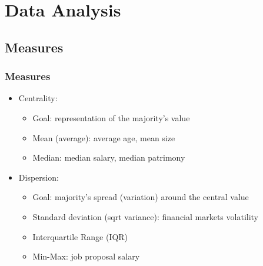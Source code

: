 



\begin{frame}
   \titlepage
\end{frame}



\begin{frame}
   \tableofcontents
\end{frame}

\section{Data Analysis}


\subsection{Measures}


\begin{frame}\frametitle{Measures}
   \begin{itemize}
      \item Centrality:
      \begin{itemize}
         \item Goal: representation of the majority's value
         \item Mean (average): average age, mean size
         \item Median: median salary, median patrimony
      \end{itemize}
      \item Dispersion:
      \begin{itemize}
         \item Goal: majority's spread (variation) around the central value
         \item Standard deviation (sqrt variance): financial markets volatility
         \item Interquartile Range (IQR)
         \item Min-Max: job proposal salary
      \end{itemize}
   \end{itemize}
\end{frame}



